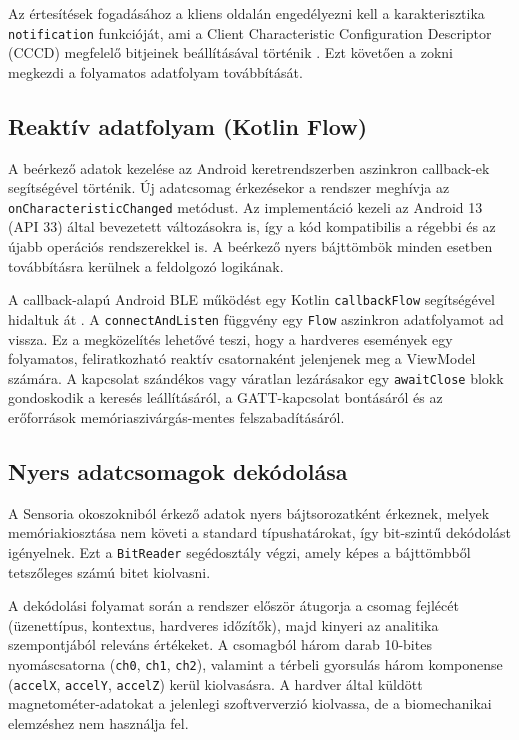 Az értesítések fogadásához a kliens oldalán engedélyezni kell a karakterisztika \texttt{notification}
funkcióját, ami a Client Characteristic Configuration Descriptor (CCCD) megfelelő bitjeinek
beállításával történik \cite{androidble}. Ezt követően a zokni megkezdi a folyamatos adatfolyam továbbítását.

\subsection{Reaktív adatfolyam (Kotlin Flow)}

A beérkező adatok kezelése az Android keretrendszerben aszinkron callback-ek segítségével történik.
Új adatcsomag érkezésekor a rendszer meghívja az \texttt{onCharacteristicChanged} metódust.
Az implementáció kezeli az Android 13 (API 33) által bevezetett változásokra is,
így a kód kompatibilis a régebbi és az újabb operációs rendszerekkel is. A beérkező nyers
bájttömbök minden esetben továbbításra kerülnek a feldolgozó logikának.

A callback-alapú Android BLE működést egy Kotlin \texttt{callbackFlow} segítségével hidaltuk át \cite{kotlinflow}.
A \texttt{connectAndListen} függvény egy \texttt{Flow} aszinkron adatfolyamot ad vissza.
Ez a megközelítés lehetővé teszi, hogy a hardveres események egy folyamatos, feliratkozható
reaktív csatornaként jelenjenek meg a ViewModel számára. A kapcsolat szándékos vagy váratlan
lezárásakor egy \texttt{awaitClose} blokk gondoskodik a keresés leállításáról, a GATT-kapcsolat
bontásáról és az erőforrások memóriaszivárgás-mentes felszabadításáról.

\subsection{Nyers adatcsomagok dekódolása}

A Sensoria okoszokniból érkező adatok nyers bájtsorozatként érkeznek, melyek memóriakiosztása
nem követi a standard típushatárokat, így bit-szintű dekódolást igényelnek. Ezt a \texttt{BitReader}
segédosztály végzi, amely képes a bájttömbből tetszőleges számú bitet kiolvasni.

A dekódolási folyamat során a rendszer először átugorja a csomag fejlécét (üzenettípus,
kontextus, hardveres időzítők), majd kinyeri az analitika szempontjából releváns értékeket.
A csomagból három darab 10-bites nyomáscsatorna (\texttt{ch0}, \texttt{ch1}, \texttt{ch2}),
valamint a térbeli gyorsulás három komponense (\texttt{accelX}, \texttt{accelY}, \texttt{accelZ})
kerül kiolvasásra. A hardver által küldött magnetométer-adatokat a jelenlegi szoftververzió kiolvassa,
de a biomechanikai elemzéshez nem használja fel.

